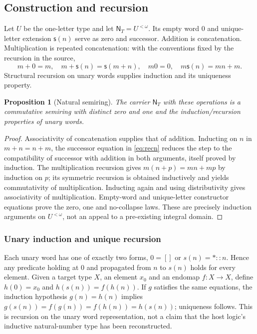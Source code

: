 \documentclass[11pt,reqno]{amsart}
\newtheorem{proposition}[theorem]{Proposition}
\theoremstyle{definition}\newtheorem{definition}[theorem]{Definition}
\theoremstyle{remark}\newtheorem{remark}[theorem]{Remark}
\newcommand{\N}{\mathsf N_T}\newcommand{\Z}{\mathsf Z_T}\newcommand{\Q}{\mathsf Q_T}\newcommand{\RR}{\mathsf R}
\begin{document}
\subsection{Construction and recursion}\label{main:sub-07}
Let $U$ be the one-letter type and let $\N=U^{<\omega}$. Its empty word $0$ and unique-letter extension $\mathsf{s}(n)$ serve as zero and successor. Addition is concatenation. Multiplication is repeated concatenation: with the conventions fixed by the recursion in the source,
\begin{equation}\label{eq:recn}
m+0=m,\quad m+\mathsf{s}(n)=\mathsf{s}(m+n),\quad m0=0,\quad m\mathsf{s}(n)=mn+m.
\end{equation}
Structural recursion on unary words supplies induction and its uniqueness property.

\begin{proposition}[Natural semiring]
The carrier $\N$ with these operations is a commutative semiring with distinct zero and one and the induction/recursion properties of unary words.
\end{proposition}
\begin{proof}
Associativity of concatenation supplies that of addition. Inducting on $n$ in $m+n=n+m$, the successor equation in \eqref{eq:recn} reduces the step to the compatibility of successor with addition in both arguments, itself proved by induction. The multiplication recursion gives $m(n+p)=mn+mp$ by induction on $p$; its symmetric recursion is obtained inductively and yields commutativity of multiplication. Inducting again and using distributivity gives associativity of multiplication. Empty-word and unique-letter constructor equations prove the zero, one and no-collapse laws. These are precisely induction arguments on $U^{<\omega}$, not an appeal to a pre-existing integral domain.
\end{proof}


\medskip
\subsubsection*{Unary induction and unique recursion}\label{supp:4-1}
Each unary word has one of exactly two forms, $0=[]$ or $s(n)=\ast::n$. Hence any predicate holding at $0$ and propagated from $n$ to $s(n)$ holds for every element. Given a target type $X$, an element $x_0$ and an endomap $f:X\to X$, define $h(0)=x_0$ and $h(s(n))=f(h(n))$. If $g$ satisfies the same equations, the induction hypothesis $g(n)=h(n)$ implies $g(s(n))=f(g(n))=f(h(n))=h(s(n))$; uniqueness follows. This is recursion on the unary word representation, not a claim that the host logic's inductive natural-number type has been reconstructed.
\medskip
\medskip
\end{document}
